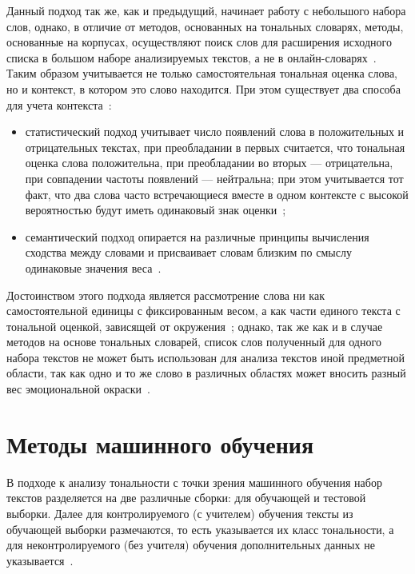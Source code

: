 Данный подход так же, как и предыдущий, начинает работу с небольшого набора
слов, однако, в отличие от методов, основанных на тональных словарях, методы,
основанные на корпусах, осуществляют поиск слов для расширения исходного списка
в большом наборе анализируемых текстов, а не в онлайн-словарях~\cite{article10}.
Таким образом учитывается не только самостоятельная тональная оценка слова, но и
контекст, в котором это слово находится. При этом существует
два способа для учета контекста~\cite{article11}:
\begin{itemize}
    \item статистический подход учитывает число появлений слова в положительных
        и отрицательных текстах, при преобладании в первых считается, что
        тональная оценка слова положительна, при преобладании во вторых ---
        отрицательна, при совпадении частоты появлений --- нейтральна; при этом
        учитывается тот факт, что два слова часто встречающиеся вместе в одном
        контексте с высокой вероятностью будут иметь одинаковый знак
        оценки~\cite{article15};
    \item семантический подход опирается на различные принципы вычисления
        сходства между словами и присваивает словам близким по смыслу одинаковые
        значения веса~\cite{article15}.
\end{itemize}

Достоинством этого подхода является рассмотрение слова ни как самостоятельной
единицы с фиксированным весом, а как части единого текста с тональной оценкой,
зависящей от окружения~\cite{article10}; однако, так же как и в случае методов
на основе тональных словарей, список слов полученный для одного набора текстов
не может быть использован для анализа текстов иной предметной области, так как
одно и то же слово в различных областях может вносить разный вес эмоциональной
окраски~\cite{article05}.


\section{Методы машинного обучения}

В подходе к анализу тональности с точки зрения машинного обучения набор
текстов разделяется на две различные сборки: для обучающей и тестовой выборки.
Далее для контролируемого (с учителем) обучения тексты из обучающей
выборки размечаются, то есть указывается их класс тональности, а для
неконтролируемого (без учителя) обучения дополнительных данных не
указывается~\cite{article16}.

